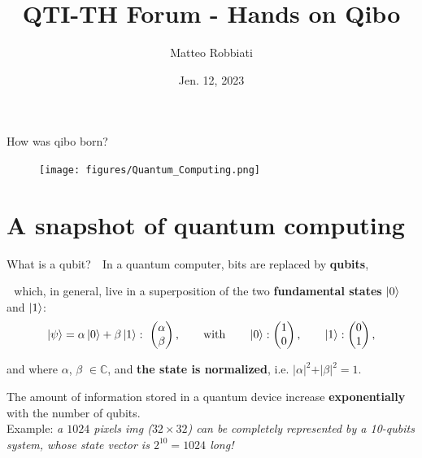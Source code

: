 \documentclass[8pt, xcolor={svgnames}, hyperref={colorlinks,linkcolor=black, citecolor=amethyst, urlcolor=amethyst}]{beamer}
\title{QTI-TH Forum - Hands on Qibo}
\date{Jen. 12, 2023}
\author[Matteo Robbiati]{Matteo Robbiati}
\begin{document}
\maketitle

\begin{frame}{How was qibo born?}
    \begin{figure}  
    \texttt{[image: figures/Quantum\_Computing.png]}
    \end{figure}
    \vspace{-0.5cm}
\end{frame}

\section{A snapshot of quantum computing}

\begin{frame}{What is a qubit?}
\large
\faArrowCircleRight\,\, In a quantum computer, bits are replaced by \textbf{qubits},
\pause

\faArrowCircleRight\,\, which, in general, live in a superposition of 
the two \textbf{fundamental states} $\ket{0}$ and $\ket{1}$:
\begin{equation*}
    \ket{\psi} = \alpha \ket{0} + \beta \ket{1}: \,\,
    \begin{pmatrix} 
    \alpha \\ 
    \beta 
    \end{pmatrix}, \qquad \text{with} \qquad     
    \ket{0}:
    \begin{pmatrix} 
    1 \\ 
    0  
    \end{pmatrix}, \qquad \ket{1}:
    \begin{pmatrix} 
    0 \\ 
    1 
    \end{pmatrix}, 
\end{equation*}

and where $\alpha$, $\beta$ $\in \mathbb{C}$, and \textbf{the state is normalized}, i.e. $
    \vert \alpha \vert^2 + \vert \beta \vert^2 = 1.
$   
\pause
\vspace{0.8cm}
\begin{tcolorbox}[colback=amethyst!30, title=Storage advantage]
  The amount of information stored in a quantum device increase \textbf{exponentially}
  with the number of qubits. \\
  
  Example: \textit{a $1024$ pixels img ($32 \times 32$) can be completely represented 
  by a 10-qubits system, whose state vector is $2^{10}=1024$ long!}
\end{tcolorbox}
\end{frame}
\end{document}
